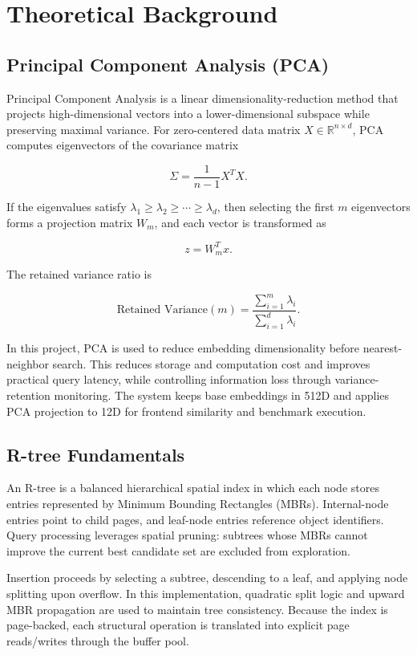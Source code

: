 \documentclass[11pt,a4paper]{article}
\begin{document}
\section{Theoretical Background}

\subsection{Principal Component Analysis (PCA)}

Principal Component Analysis is a linear dimensionality-reduction method that projects high-dimensional vectors into a lower-dimensional subspace while preserving maximal variance. For zero-centered data matrix $X \in \mathbb{R}^{n \times d}$, PCA computes eigenvectors of the covariance matrix

\[
\Sigma = \frac{1}{n-1} X^T X.
\]

If the eigenvalues satisfy $\lambda_1 \ge \lambda_2 \ge \cdots \ge \lambda_d$, then selecting the first $m$ eigenvectors forms a projection matrix $W_m$, and each vector is transformed as

\[
z = W_m^T x.
\]

The retained variance ratio is

\[
\text{Retained Variance}(m) = \frac{\sum_{i=1}^{m} \lambda_i}{\sum_{i=1}^{d} \lambda_i}.
\]

In this project, PCA is used to reduce embedding dimensionality before nearest-neighbor search. This reduces storage and computation cost and improves practical query latency, while controlling information loss through variance-retention monitoring. The system keeps base embeddings in 512D and applies PCA projection to 12D for frontend similarity and benchmark execution.

\subsection{R-tree Fundamentals}

An R-tree is a balanced hierarchical spatial index in which each node stores entries represented by Minimum Bounding Rectangles (MBRs). Internal-node entries point to child pages, and leaf-node entries reference object identifiers. Query processing leverages spatial pruning: subtrees whose MBRs cannot improve the current best candidate set are excluded from exploration.

Insertion proceeds by selecting a subtree, descending to a leaf, and applying node splitting upon overflow. In this implementation, quadratic split logic and upward MBR propagation are used to maintain tree consistency. Because the index is page-backed, each structural operation is translated into explicit page reads/writes through the buffer pool.
\end{document}
